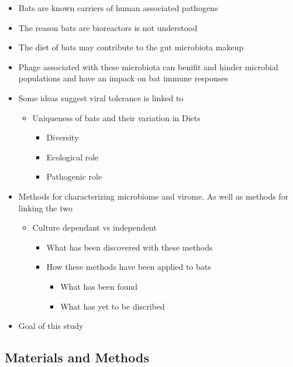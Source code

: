 \documentclass[
]{article}
\providecommand{\tightlist}{%
  \setlength{\itemsep}{0pt}\setlength{\parskip}{0pt}}
\begin{document}
\begin{itemize}
\tightlist
\item
  Bats are known carriers of human associated pathogens
\item
  The reason bats are bioreactors is not understood
\item
  The diet of bats may contribute to the gut microbiota makeup
\item
  Phage associated with these microbiota can benifit and hinder
  microbial populations and have an impack on bat immune responses
\item
  Some ideas suggest viral tolerance is linked to

  \begin{itemize}
  \tightlist
  \item
    Uniqueness of bats and their variation in Diets

    \begin{itemize}
    \tightlist
    \item
      Diversity
    \item
      Ecological role
    \item
      Pathogenic role
    \end{itemize}
  \end{itemize}
\item
  Methods for characterizing microbiome and virome. As well as methods
  for linking the two

  \begin{itemize}
  \tightlist
  \item
    Culture dependant vs independent

    \begin{itemize}
    \tightlist
    \item
      What has been discovered with these methods
    \item
      How these methods have been applied to bats

      \begin{itemize}
      \tightlist
      \item
        What has been found
      \item
        What has yet to be discribed
      \end{itemize}
    \end{itemize}
  \end{itemize}
\item
  Goal of this study
\end{itemize}

\subsection{Materials and Methods}\label{materials-and-methods}
\end{document}
